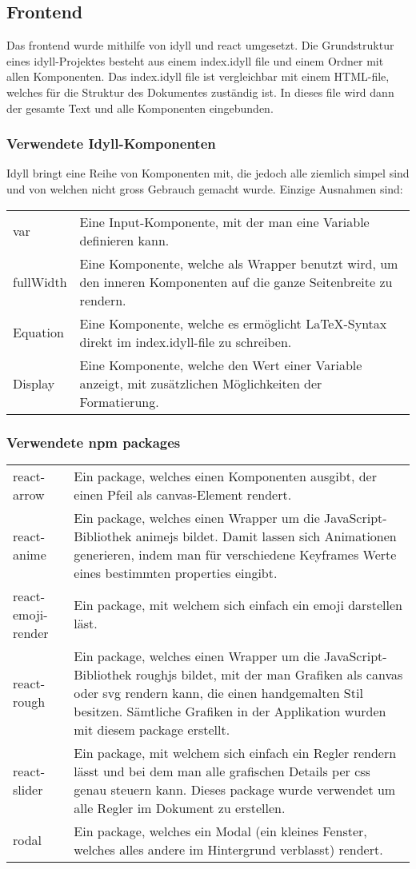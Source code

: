 \documentclass[a4paper,10.2pt,pdftex]{scrartcl}%
\begin{document}
\subsection{Frontend}
Das frontend wurde mithilfe von idyll und react umgesetzt. Die Grundstruktur eines idyll-Projektes besteht aus einem index.idyll file und einem Ordner mit allen Komponenten. Das index.idyll file ist vergleichbar mit einem HTML-file, welches für die Struktur des Dokumentes zuständig ist. In dieses file wird dann der gesamte Text und alle Komponenten eingebunden.
\subsubsection{Verwendete Idyll-Komponenten}
Idyll bringt eine Reihe von Komponenten mit, die jedoch alle ziemlich simpel sind und von welchen nicht gross Gebrauch gemacht wurde. Einzige Ausnahmen sind:

\begin{tabularx}{\textwidth}{p{2.5cm}p{11cm}}
var & Eine Input-Komponente, mit der man eine Variable definieren kann. \\
fullWidth & Eine Komponente, welche als Wrapper benutzt wird, um den inneren Komponenten auf die ganze Seitenbreite zu rendern. \\
Equation & Eine Komponente, welche es ermöglicht LaTeX-Syntax direkt im index.idyll-file zu schreiben. \\
Display & Eine Komponente, welche den Wert einer Variable anzeigt, mit zusätzlichen Möglichkeiten der Formatierung.
\end{tabularx}

\subsubsection{Verwendete npm packages}
\begin{tabularx}{\textwidth}{p{3cm}p{11cm}}
react-arrow&  Ein package, welches einen Komponenten ausgibt, der einen Pfeil als canvas-Element rendert. \\
react-anime&  Ein package, welches einen Wrapper um die JavaScript-Bibliothek animejs bildet. Damit lassen sich Animationen generieren, indem man für verschiedene Keyframes Werte eines bestimmten properties eingibt. \\
react-emoji-render&  Ein package, mit welchem sich einfach ein emoji darstellen läst. \\
react-rough&  Ein package, welches einen Wrapper um die JavaScript-Bibliothek roughjs bildet, mit der man Grafiken als canvas oder svg rendern kann, die einen handgemalten Stil besitzen. Sämtliche Grafiken in der Applikation wurden mit diesem package erstellt. \\
react-slider&  Ein package, mit welchem sich einfach ein Regler rendern lässt und bei dem man alle grafischen  Details per css genau steuern kann. Dieses package wurde verwendet um alle Regler im Dokument zu erstellen. \\
rodal&  Ein package, welches ein Modal (ein kleines Fenster, welches alles andere im Hintergrund verblasst)  rendert.

\end{tabularx}
\end{document}
